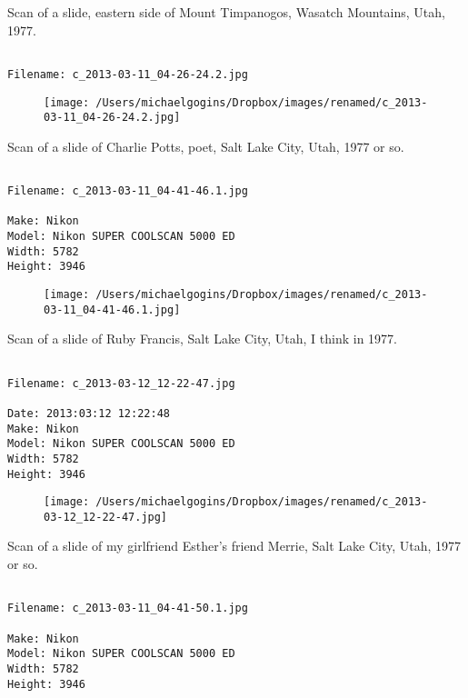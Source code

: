 \documentclass[11pt,letter,DIV=14,paper=landscape]{scrbook}
\begin{document}
\clearpage
\noindent Scan of a slide, eastern side of Mount Timpanogos, Wasatch Mountains, Utah, 1977.
\noindent
\begin{lstlisting}

Filename: c_2013-03-11_04-26-24.2.jpg

\end{lstlisting}
\clearpage

\begin{figure}
\texttt{[image: /Users/michaelgogins/Dropbox/images/renamed/c\_2013-03-11\_04-26-24.2.jpg]}
\end{figure}
    
\clearpage
\noindent Scan of a slide of Charlie Potts, poet, Salt Lake City, Utah, 1977 or so.
\noindent
\begin{lstlisting}

Filename: c_2013-03-11_04-41-46.1.jpg

Make: Nikon
Model: Nikon SUPER COOLSCAN 5000 ED
Width: 5782
Height: 3946
\end{lstlisting}
\clearpage

\begin{figure}
\texttt{[image: /Users/michaelgogins/Dropbox/images/renamed/c\_2013-03-11\_04-41-46.1.jpg]}
\end{figure}
    
\clearpage
\noindent Scan of a slide of Ruby Francis, Salt Lake City, Utah, I think in 1977.
\noindent
\begin{lstlisting}

Filename: c_2013-03-12_12-22-47.jpg

Date: 2013:03:12 12:22:48
Make: Nikon
Model: Nikon SUPER COOLSCAN 5000 ED
Width: 5782
Height: 3946
\end{lstlisting}
\clearpage

\begin{figure}
\texttt{[image: /Users/michaelgogins/Dropbox/images/renamed/c\_2013-03-12\_12-22-47.jpg]}
\end{figure}
    
\clearpage
\noindent Scan of a slide of my girlfriend Esther's friend Merrie, Salt Lake City, Utah, 1977 or so.
\noindent
\begin{lstlisting}

Filename: c_2013-03-11_04-41-50.1.jpg

Make: Nikon
Model: Nikon SUPER COOLSCAN 5000 ED
Width: 5782
Height: 3946
\end{lstlisting}
\clearpage
\end{document}
